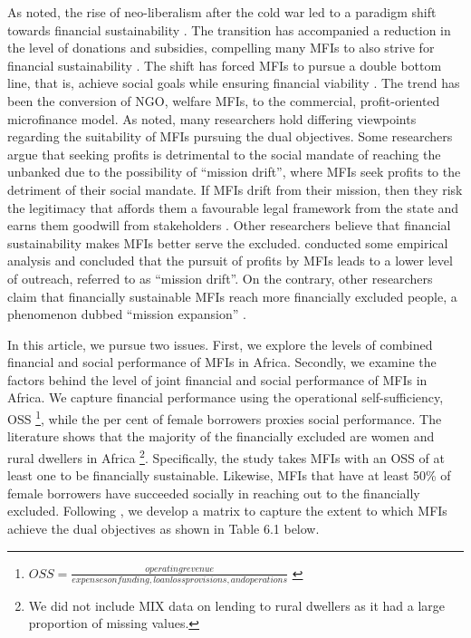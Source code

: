 \documentclass[a4paper, nobind]{templates/ociamthesis}
\begin{document}
As noted, the rise of neo-liberalism after the cold war led to a paradigm shift towards financial sustainability \autocite{bateman2010doesn}. The transition has accompanied a reduction in the level of donations and subsidies, compelling many MFIs to also strive for financial sustainability \autocite{d2017ngos}. The shift has forced MFIs to pursue a double bottom line, that is, achieve social goals while ensuring financial viability \autocite{ramus2017}. The trend has been the conversion of NGO, welfare MFIs, to the commercial, profit-oriented microfinance model. As noted, many researchers hold differing viewpoints regarding the suitability of MFIs pursuing the dual objectives. Some researchers argue that seeking profits is detrimental to the social mandate of reaching the unbanked due to the possibility of ``mission drift'', where MFIs seek profits to the detriment of their social mandate. If MFIs drift from their mission, then they risk the legitimacy that affords them a favourable legal framework from the state and earns them goodwill from stakeholders \autocite{market2018global}. Other researchers believe that financial sustainability makes MFIs better serve the excluded. \textcite{mersland2010microfinance} conducted some empirical analysis and concluded that the pursuit of profits by MFIs leads to a lower level of outreach, referred to as ``mission drift''. On the contrary, other researchers claim that financially sustainable MFIs reach more financially excluded people, a phenomenon dubbed ``mission expansion'' \autocite{mersland2010microfinance}.

In this article, we pursue two issues. First, we explore the levels of combined financial and social performance of MFIs in Africa. Secondly, we examine the factors behind the level of joint financial and social performance of MFIs in Africa. We capture financial performance using the operational self-sufficiency, OSS \footnote{\(OSS = \frac{operating revenue}{expenses on funding, loan loss provisions, and operations}\) \autocite{market2018global}}, while the per cent of female borrowers proxies social performance. The literature shows that the majority of the financially excluded are women and rural dwellers in Africa \footnote{We did not include MIX data on lending to rural dwellers as it had a large proportion of missing values.}. Specifically, the study takes MFIs with an OSS of at least one to be financially sustainable. Likewise, MFIs that have at least 50\% of female borrowers have succeeded socially in reaching out to the financially excluded. Following \textcite{chattopadhyay2017applicability}, we develop a matrix to capture the extent to which MFIs achieve the dual objectives as shown in Table 6.1 below.
\end{document}
